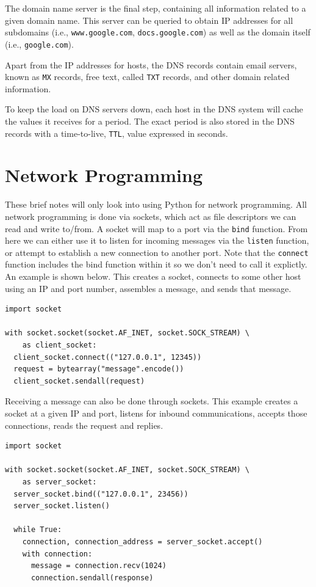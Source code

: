 The domain name server is the final step, containing all information related to a given domain name. This server can be queried to obtain IP addresses for all subdomains (i.e., \texttt{www.google.com}, \texttt{docs.google.com}) as well as the domain itself (i.e., \texttt{google.com}).

Apart from the IP addresses for hosts, the DNS records contain email servers, known as \texttt{MX} records, free text, called \texttt{TXT} records, and other domain related information.

To keep the load on DNS servers down, each host in the DNS system will cache the values it receives for a period. The exact period is also stored in the DNS records with a time-to-live, \texttt{TTL}, value expressed in seconds.

\section{Network Programming}
These brief notes will only look into using Python for network programming. All network programming is done via sockets, which act as file descriptors we can read and write to/from. A socket will map to a port via the \texttt{bind} function. From here we can either use it to listen for incoming messages via the \texttt{listen} function, or attempt to establish a new connection to another port. Note that the \texttt{connect} function includes the bind function within it so we don't need to call it explictly. An example is shown below. This creates a socket, connects to some other host using an IP and port number, assembles a message, and sends that message.

\begin{lstlisting}
import socket

with socket.socket(socket.AF_INET, socket.SOCK_STREAM) \
    as client_socket:
  client_socket.connect(("127.0.0.1", 12345))
  request = bytearray("message".encode())
  client_socket.sendall(request)
\end{lstlisting}

Receiving a message can also be done through sockets. This example creates a socket at a given IP and port, listens for inbound communications, accepts those connections, reads the request and replies.

\begin{lstlisting}
import socket

with socket.socket(socket.AF_INET, socket.SOCK_STREAM) \
    as server_socket:
  server_socket.bind(("127.0.0.1", 23456))
  server_socket.listen()

  while True:
    connection, connection_address = server_socket.accept()
    with connection:
      message = connection.recv(1024)
      connection.sendall(response)
\end{lstlisting}

